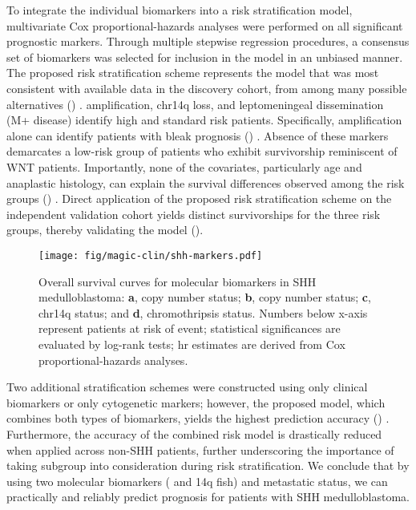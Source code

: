 To integrate the individual biomarkers into a risk stratification model, multivariate Cox proportional-hazards analyses were performed on all significant prognostic markers. Through multiple stepwise regression procedures, a consensus set of biomarkers was selected for inclusion in the model in an unbiased manner. The proposed risk stratification scheme represents the model that was most consistent with available data in the discovery cohort, from among many possible alternatives () .  amplification, chr14q loss, and leptomeningeal dissemination (M+ disease) identify high and standard risk patients. Specifically,  amplification alone can identify patients with bleak prognosis () . Absence of these markers demarcates a low-risk group of patients who exhibit survivorship reminiscent of WNT patients. Importantly, none of the covariates, particularly age and anaplastic histology, can explain the survival differences observed among the risk groups () . Direct application of the proposed risk stratification scheme on the independent validation cohort yields distinct survivorships for the three risk groups, thereby validating the model ().

\begin{figure}[h]
	\begin{center}
		\texttt{[image: fig/magic-clin/shh-markers.pdf]}
	\end{center}
	\caption[Overall survival curves for molecular biomarkers in SHH medulloblastoma]
	{
	Overall survival curves for molecular biomarkers in SHH medulloblastoma:
	\textbf{a},  copy number status;
	\textbf{b},  copy number status;
	\textbf{c}, chr14q status; and
	\textbf{d}, chromothripsis status.
	Numbers below x-axis represent patients at risk of event; statistical significances are evaluated by log-rank tests; \gls{hr} estimates are derived from Cox proportional-hazards analyses.
	}
	\label{fig:shh-markers}
\end{figure}

Two additional stratification schemes were constructed using only clinical biomarkers or only cytogenetic markers; however, the proposed model, which combines both types of biomarkers, yields the highest prediction accuracy () . Furthermore, the accuracy of the combined risk model is drastically reduced when applied across non-SHH patients, further underscoring the importance of taking subgroup into consideration during risk stratification. We conclude that by using two molecular biomarkers ( and 14q \gls{fish}) and metastatic status, we can practically and reliably predict prognosis for patients with SHH medulloblastoma.

